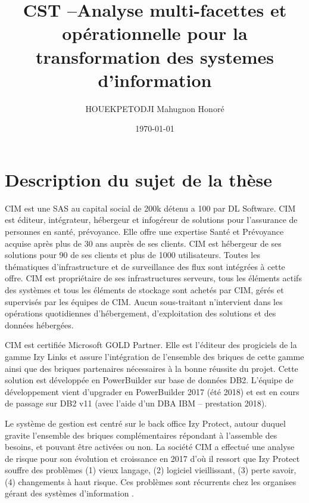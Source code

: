 \documentclass[a4paper]{article}
\title{CST --Analyse multi-facettes et opérationnelle pour la transformation des systemes d’information}
\author{ HOUEKPETODJI Mahugnon Honoré}
\begin{document}
\institution{}

\date{\today}

\maketitle


\section{Description du sujet de la thèse}
CIM est une SAS au capital social de 200k détenu a 100 par DL Software. 
CIM est éditeur, intégrateur, hébergeur et infogéreur de solutions pour l'assurance de personnes en santé, prévoyance. 
Elle offre une expertise Santé et Prévoyance acquise après plus de 30 ans auprès de ses clients. 
CIM est hébergeur de ses solutions pour 90 de ses clients et plus de 1000 utilisateurs. 
Toutes les thématiques d'infrastructure et de surveillance des flux sont intégrées à cette offre.
CIM est propriétaire de ses infrastructures serveurs, tous les éléments actifs des systèmes et tous les éléments de stockage sont achetés par CIM, gérés et supervisés par les équipes de CIM. Aucun sous-traitant n'intervient dans les opérations quotidiennes d'hébergement, d'exploitation des solutions et des données hébergées.

CIM est certifiée Microsoft GOLD Partner. 
Elle est l'éditeur des progiciels de la gamme Izy Links et assure l'intégration de l'ensemble des briques de cette gamme ainsi que des briques partenaires nécessaires à la bonne réussite du projet. Cette solution est développée en PowerBuilder sur base de données DB2. L'équipe de développement
vient d'upgrader en PowerBuilder 2017 (été 2018) et est en cours de passage sur DB2 v11 (avec l'aide d'un DBA IBM – prestation 2018).

Le système de gestion est centré sur le back office Izy Protect, autour duquel gravite l'ensemble des briques complémentaires répondant à l'assemble des besoins, et pouvant
être activées ou non. 
La société CIM a effectué une analyse de risque pour son évolution et croissance en 2017 d'où il ressort que Izy Protect souffre des problèmes 
(1) vieux langage,
(2) logiciel vieillissant,
(3) perte savoir,
(4) changements à haut risque.
Ces problèmes sont récurrents chez les organises gérant des systèmes d'information \cite{Deme02a}.
\end{document}
